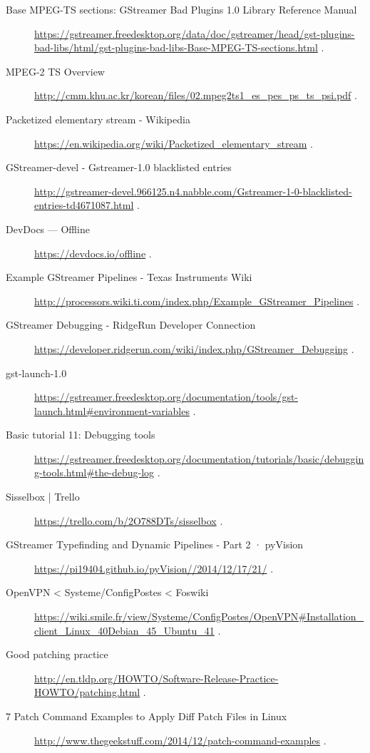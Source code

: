 \begin{description}
\item [Base MPEG-TS sections: GStreamer Bad Plugins 1.0 Library Reference Manual] \url{https://gstreamer.freedesktop.org/data/doc/gstreamer/head/gst-plugins-bad-libs/html/gst-plugins-bad-libs-Base-MPEG-TS-sections.html} . 
\item [MPEG-2 TS Overview] \url{http://cmm.khu.ac.kr/korean/files/02.mpeg2ts1_es_pes_ps_ts_psi.pdf} . 
\item [Packetized elementary stream - Wikipedia] \url{https://en.wikipedia.org/wiki/Packetized_elementary_stream} . 
\item [GStreamer-devel - Gstreamer-1.0 blacklisted entries] \url{http://gstreamer-devel.966125.n4.nabble.com/Gstreamer-1-0-blacklisted-entries-td4671087.html} . 
\item [DevDocs — Offline] \url{https://devdocs.io/offline} . 
\item [Example GStreamer Pipelines - Texas Instruments Wiki] \url{http://processors.wiki.ti.com/index.php/Example_GStreamer_Pipelines} . 
\item [GStreamer Debugging - RidgeRun Developer Connection] \url{https://developer.ridgerun.com/wiki/index.php/GStreamer_Debugging} . 
\item [gst-launch-1.0] \url{https://gstreamer.freedesktop.org/documentation/tools/gst-launch.html#environment-variables} . 
\item [Basic tutorial 11: Debugging tools] \url{https://gstreamer.freedesktop.org/documentation/tutorials/basic/debugging-tools.html#the-debug-log} . 
\item [Sisselbox | Trello] \url{https://trello.com/b/2O788DTs/sisselbox} . 
\item [GStreamer Typefinding and Dynamic Pipelines - Part 2 · pyVision] \url{https://pi19404.github.io/pyVision//2014/12/17/21/} . 
\item [OpenVPN < Systeme/ConfigPostes < Foswiki] \url{https://wiki.smile.fr/view/Systeme/ConfigPostes/OpenVPN#Installation_client_Linux_40Debian_45_Ubuntu_41} . 
\item [Good patching practice] \url{http://en.tldp.org/HOWTO/Software-Release-Practice-HOWTO/patching.html} . 
\item [7 Patch Command Examples to Apply Diff Patch Files in Linux] \url{http://www.thegeekstuff.com/2014/12/patch-command-examples} . 
\end{description}